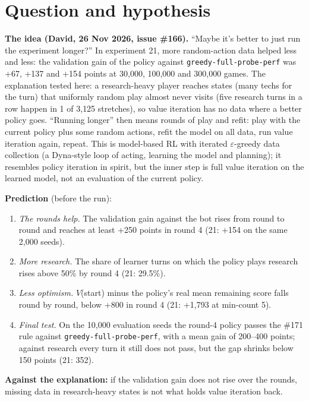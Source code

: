 \documentclass{../polyexp}
\begin{document}

\ExpHeader

\section{Question and hypothesis}
\textbf{The idea (David, 26 Nov 2026, issue \#166).} ``Maybe it's better to just run the experiment longer?'' In
experiment 21, more random-action data helped less and less: the validation gain of the policy against
\texttt{greedy-full-probe-perf} was +67, +137 and +154 points at 30{,}000, 100{,}000 and 300{,}000 games. The
explanation tested here: a research-heavy player reaches states (many techs for the turn) that uniformly random
play almost never visits (five research turns in a row happen in 1 of 3{,}125 stretches), so value iteration has no
data where a better policy goes. ``Running longer'' then means rounds of play and refit: play with the current
policy plus some random actions, refit the model on all data, run value iteration again, repeat. This is model-based
RL with iterated $\varepsilon$-greedy data collection (a Dyna-style loop of acting, learning the model and planning);
it resembles policy iteration in spirit, but the inner step is full value iteration on the learned model, not an
evaluation of the current policy.

\textbf{Prediction} (before the run):
\begin{enumerate}
  \item \emph{The rounds help.} The validation gain against the bot rises from round to round and reaches at least
        +250 points in round 4 (21: +154 on the same 2{,}000 seeds).
  \item \emph{More research.} The share of learner turns on which the policy plays research rises above 50\% by
        round 4 (21: 29.5\%).
  \item \emph{Less optimism.} $V$(start) minus the policy's real mean remaining score falls round by round, below
        +800 in round 4 (21: +1{,}793 at min-count 5).
  \item \emph{Final test.} On the 10{,}000 evaluation seeds the round-4 policy passes the \#171 rule against
        \texttt{greedy-full-probe-perf}, with a mean gain of 200--400 points; against research every turn it still
        does not pass, but the gap shrinks below 150 points (21: 352).
\end{enumerate}
\textbf{Against the explanation:} if the validation gain does not rise over the rounds, missing data in
research-heavy states is not what holds value iteration back.
\end{document}
